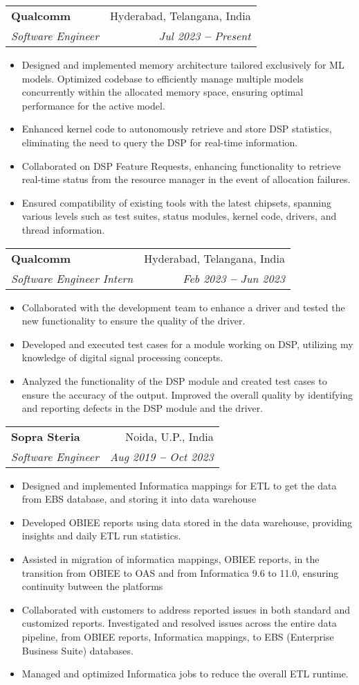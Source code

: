 \documentclass[letterpaper,9pt]{article}
\makeatletter
\newcommand{\resumeItem}[1]{
  \item\small{
    {#1 \vspace{-2pt}}
  }
}
\newcommand{\resumeSubheading}[4]{
  \vspace{-2pt}\item
    \begin{tabular*}{0.97\textwidth}[t]{l@{\extracolsep{\fill}}r}
      \textbf{#1} & #2 \\
      \textit{\small#3} & \textit{\small #4} \\
    \end{tabular*}\vspace{-7pt}
}
\newcommand{\resumeItemListStart}{\begin{itemize}}
\newcommand{\resumeItemListEnd}{\end{itemize}\vspace{-5pt}}
\makeatother
\begin{document}
    \resumeSubheading
      {Qualcomm}{Hyderabad, Telangana, India}
      {Software Engineer}{Jul 2023 \textbf{--} Present}
        \resumeItemListStart
            \resumeItem{Designed and implemented memory architecture tailored exclusively for ML models. Optimized codebase to efficiently manage multiple models concurrently within the allocated memory space, ensuring optimal performance for the active model.}
            \resumeItem{Enhanced kernel code to autonomously retrieve and store DSP statistics, eliminating the need to query the DSP for real-time information.}
            \resumeItem{Collaborated on DSP Feature Requests, enhancing functionality to retrieve real-time status from the resource manager in the event of allocation failures.}
            \resumeItem{Ensured compatibility of existing tools with the latest chipsets, spanning various levels such as test suites, status modules, kernel code, drivers, and thread information.}
        \resumeItemListEnd
        
    \resumeSubheading
      {Qualcomm}{Hyderabad, Telangana, India}
      {Software Engineer Intern}{Feb 2023 \textbf{--} Jun 2023}
        \resumeItemListStart
            \resumeItem{Collaborated with the development team to enhance a driver and tested the new functionality to ensure the quality of the driver.}
            \resumeItem{Developed and executed test cases for a module working on DSP, utilizing my knowledge of digital signal processing concepts.}
            \resumeItem{Analyzed the functionality of the DSP module and created test cases to ensure the accuracy of the output. Improved the overall quality by identifying and reporting defects in the DSP module and the driver.}
        \resumeItemListEnd

    \resumeSubheading
      {Sopra Steria}{Noida, U.P., India}
      {Software Engineer}{Aug 2019 \textbf{--} Oct 2023}
        \resumeItemListStart
            \resumeItem{Designed and implemented Informatica mappings for ETL to get the data from EBS database, and storing it into data warehouse}
            \resumeItem{Developed OBIEE reports using data stored in the data warehouse, providing insights and daily ETL run statistics.}
            \resumeItem{Assisted in migration of informatica mappings, OBIEE reports, in the transition from OBIEE to OAS and from Informatica 9.6 to 11.0, ensuring continuity butween the platforms}
            \resumeItem{Collaborated with customers to address reported issues in both standard and customized reports. Investigated and resolved issues across the entire data pipeline, from OBIEE reports, Informatica mappings, to EBS (Enterprise Business Suite) databases.}
            \resumeItem{Managed and optimized Informatica jobs to reduce the overall ETL runtime.}
        \resumeItemListEnd
        
\end{document}
